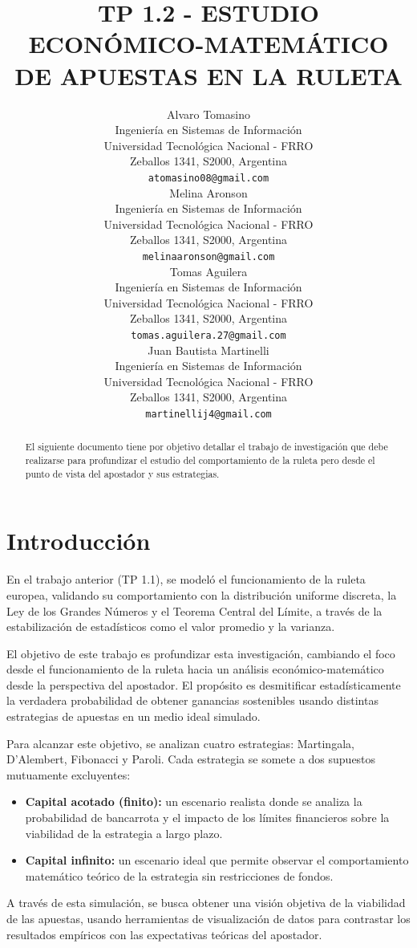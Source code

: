 \documentclass{article}
\title{TP 1.2 - ESTUDIO ECONÓMICO-MATEMÁTICO DE APUESTAS EN LA RULETA}
\author{
    Alvaro Tomasino \\
    Ingeniería en Sistemas de Información\\
    Universidad Tecnológica Nacional - FRRO\\
    Zeballos 1341, S2000, Argentina\\
    \texttt{atomasino08@gmail.com} \\
\And
    Melina Aronson \\
    Ingeniería en Sistemas de Información\\
    Universidad Tecnológica Nacional - FRRO\\
    Zeballos 1341, S2000, Argentina\\
    \texttt{melinaaronson@gmail.com} \\
\And
    Tomas Aguilera \\
    Ingeniería en Sistemas de Información\\
    Universidad Tecnológica Nacional - FRRO\\
    Zeballos 1341, S2000, Argentina\\
    \texttt{tomas.aguilera.27@gmail.com} \\
\And
    Juan Bautista Martinelli \\
    Ingeniería en Sistemas de Información\\
    Universidad Tecnológica Nacional - FRRO\\
    Zeballos 1341, S2000, Argentina\\
    \texttt{martinellij4@gmail.com} \\
}
\begin{document}
\maketitle




\begin{abstract}
  El siguiente documento tiene por objetivo detallar el trabajo de investigación que debe realizarse para profundizar el estudio del comportamiento de la ruleta pero desde el punto de vista del apostador y sus estrategias.
\end{abstract}







\section{Introducción}
En el trabajo anterior (TP 1.1), se modeló el funcionamiento de la ruleta europea, validando su comportamiento con la distribución uniforme discreta, la Ley de los Grandes Números y el Teorema Central del Límite, a través de la estabilización de estadísticos como el valor promedio y la varianza.

El objetivo de este trabajo es profundizar esta investigación, cambiando el foco desde el funcionamiento de la ruleta hacia un análisis económico-matemático desde la perspectiva del apostador. El propósito es desmitificar estadísticamente la verdadera probabilidad de obtener ganancias sostenibles usando distintas estrategias de apuestas en un medio ideal simulado.

Para alcanzar este objetivo, se analizan cuatro estrategias: Martingala, D'Alembert, Fibonacci y Paroli. Cada estrategia se somete a dos supuestos mutuamente excluyentes:

\begin{itemize}
  \item \textbf{Capital acotado (finito):} un escenario realista donde se analiza la probabilidad de bancarrota y el impacto de los límites financieros sobre la viabilidad de la estrategia a largo plazo.
  \item \textbf{Capital infinito:} un escenario ideal que permite observar el comportamiento matemático teórico de la estrategia sin restricciones de fondos.
\end{itemize}

A través de esta simulación, se busca obtener una visión objetiva de la viabilidad de las apuestas, usando herramientas de visualización de datos para contrastar los resultados empíricos con las expectativas teóricas del apostador.
\end{document}
